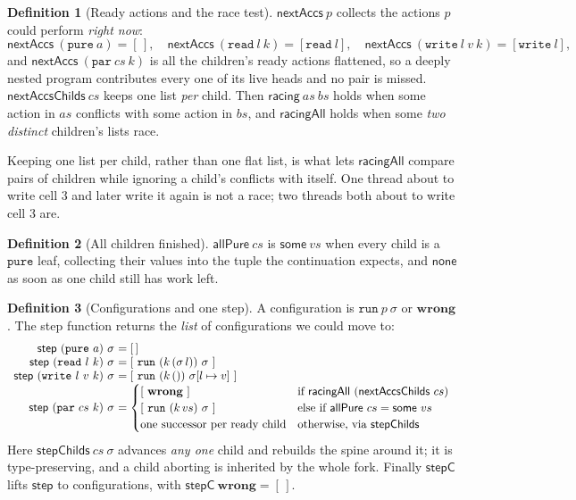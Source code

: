 \documentclass[11pt,a4paper]{article}
\theoremstyle{definition}
\newtheorem{definition}{Definition}
\theoremstyle{plain}
\theoremstyle{remark}
\newcommand{\st}{\sigma}
\newcommand{\wrong}{\mathbf{wrong}}
\newcommand{\upd}[3]{#1[#2 \mapsto #3]}
\begin{document}
\begin{definition}[Ready actions and the race test]\label{def:racing}
$\mathsf{nextAccs}\ p$ collects the actions $p$ could perform \emph{right now}:
\[
  \mathsf{nextAccs}\ (\texttt{pure}\ a) = [\,], \quad
  \mathsf{nextAccs}\ (\texttt{read}\ l\ k) = [\texttt{read}\ l], \quad
  \mathsf{nextAccs}\ (\texttt{write}\ l\ v\ k) = [\texttt{write}\ l],
\]
and $\mathsf{nextAccs}\ (\texttt{par}\ cs\ k)$ is all the children's ready actions
flattened, so a deeply nested program contributes every one of its live heads and no pair is
missed. $\mathsf{nextAccsChilds}\ cs$ keeps one list \emph{per} child. Then
$\mathsf{racing}\ as\ bs$ holds when some action in $as$ conflicts with some action in $bs$,
and $\mathsf{racingAll}$ holds when some \emph{two distinct} children's lists race.
\end{definition}

Keeping one list per child, rather than one flat list, is what lets $\mathsf{racingAll}$
compare pairs of children while ignoring a child's conflicts with itself. One thread about
to write cell $3$ and later write it again is not a race; two threads both about to write
cell $3$ are.

\begin{definition}[All children finished]\label{def:allpure}
$\mathsf{allPure}\ cs$ is $\mathsf{some}\ vs$ when every child is a $\texttt{pure}$ leaf,
collecting their values into the tuple the continuation expects, and $\mathsf{none}$ as soon
as one child still has work left.
\end{definition}

\begin{definition}[Configurations and one step]\label{def:step}
A configuration is $\texttt{run}\ p\ \st$ or $\wrong$. The step function returns the
\emph{list} of configurations we could move to:
\[
\begin{array}{r@{\ }l}
  \mathsf{step}\ (\texttt{pure}\ a)\ \st &= [\,] \\
  \mathsf{step}\ (\texttt{read}\ l\ k)\ \st &= [\ \texttt{run}\ (k\,(\st\,l))\ \st\ ] \\
  \mathsf{step}\ (\texttt{write}\ l\ v\ k)\ \st &= [\ \texttt{run}\ (k\,())\ \upd{\st}{l}{v}\ ] \\
  \mathsf{step}\ (\texttt{par}\ cs\ k)\ \st &=
    \begin{cases}
      [\ \wrong\ ] & \text{if } \mathsf{racingAll}\ (\mathsf{nextAccsChilds}\ cs) \\
      [\ \texttt{run}\ (k\,vs)\ \st\ ] & \text{else if } \mathsf{allPure}\ cs = \mathsf{some}\ vs \\
      \text{one successor per ready child} & \text{otherwise, via } \mathsf{stepChilds}
    \end{cases}
\end{array}
\]
Here $\mathsf{stepChilds}\ cs\ \st$ advances \emph{any one} child and rebuilds the spine
around it; it is type-preserving, and a child aborting is inherited by the whole fork.
Finally $\mathsf{stepC}$ lifts $\mathsf{step}$ to configurations, with
$\mathsf{stepC}\ \wrong = [\,]$.
\end{definition}
\end{document}
